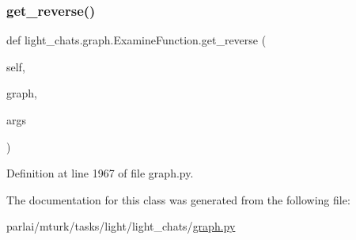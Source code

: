 \subsubsection{\texorpdfstring{get\+\_\+reverse()}{get\_reverse()}}
{\footnotesize\ttfamily def light\+\_\+chats.\+graph.\+Examine\+Function.\+get\+\_\+reverse (\begin{DoxyParamCaption}\item[{}]{self,  }\item[{}]{graph,  }\item[{}]{args }\end{DoxyParamCaption})}



Definition at line 1967 of file graph.\+py.



The documentation for this class was generated from the following file\+:\begin{DoxyCompactItemize}
\item 
parlai/mturk/tasks/light/light\+\_\+chats/\hyperlink{parlai_2mturk_2tasks_2light_2light__chats_2graph_8py}{graph.\+py}\end{DoxyCompactItemize}
